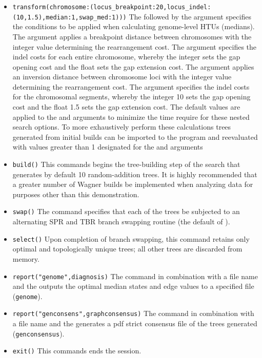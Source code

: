 \begin{itemize}
\item \texttt{transform(chromosome:(locus\_breakpoint:20,locus\_indel:\\(10,1.5),median:1,swap\_med:1)))}  The  followed by the argument  specifies the conditions to be applied when calculating genome-level HTUs (medians). The argument  applies a breakpoint distance between chromosomes with the integer value determining the rearrangement cost. The argument  specifies the indel costs for each entire chromosome, whereby the integer sets the gap opening cost and the float sets the gap extension cost.  The argument  applies an inversion distance between chromosome loci with the integer value determining the rearrangement cost. The argument  specifies the indel costs for the chromosomal segments, whereby the integer 10 sets the gap opening cost and the float 1.5 sets the gap extension cost.  The default values are applied to the  and  arguments to minimize the time require for these nested search options.   To more exhaustively perform these calculations trees generated from initial builds can be imported to the program and reevaluated with values greater than 1 designated for the  and  arguments
\item \texttt{build()} This commands begins the tree-building step of the search that generates by default 10 random-addition trees.  It is highly recommended that a greater number of Wagner builds be implemented when analyzing data for purposes other than this demonstration.
\item \texttt{swap()} The  command specifies that each of the trees be subjected to an alternating SPR and TBR branch swapping routine (the default of \poy).
\item \texttt{select()} Upon completion of branch swapping, this command retains only optimal and topologically unique trees; all other trees are discarded from memory. 
\item \texttt{report("genome",diagnosis)}  The  command in combination with a file name and the  outputs the optimal median states and edge values to a specified file (\texttt{genome}). 
\item \texttt{report("genconsens",graphconsensus)}  The  command in combination with a file name and the  generates a pdf strict consensus file of the trees generated (\texttt{genconsensus}). 
\item \texttt{exit()} This commands ends the \poy session.
\end{itemize}

